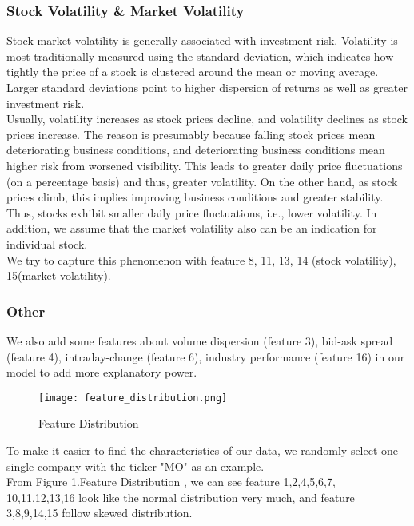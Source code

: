 \documentclass[fleqn,10pt]{SelfArx} %
\begin{document}
\subsubsection*{Stock Volatility \& Market Volatility}
Stock market volatility is generally associated with investment risk. Volatility is most traditionally measured using the standard deviation, which indicates how tightly the price of a stock is clustered around the mean or moving average. Larger standard deviations point to higher dispersion of returns as well as greater investment risk. \\
\newline
\noindent
 Usually, volatility increases as stock prices decline, and volatility declines as stock prices increase. The reason is presumably because falling stock prices mean deteriorating business conditions, and deteriorating business conditions mean higher risk from worsened visibility. This leads to greater daily price fluctuations (on a percentage basis) and thus, greater volatility. On the other hand, as stock prices climb, this implies improving business conditions and greater stability. Thus, stocks exhibit smaller daily price fluctuations, i.e., lower volatility. In addition, we assume that the market volatility also can be an indication for individual stock.\\
\newline
\noindent
We try to capture this phenomenon with feature 8, 11, 13, 14 (stock volatility), 15(market volatility).

\subsubsection*{Other}
We also add some features about volume dispersion (feature 3), bid-ask spread (feature 4), intraday-change (feature 6), industry performance (feature 16) in our model to add more explanatory power.\\

\begin{figure}[htb]\centering %
\texttt{[image: feature\_distribution.png]}
\caption{Feature Distribution}
\label{fig:view}
\end{figure}

\noindent
To make it easier to find the characteristics of our data, we randomly select one single company with the ticker "MO" as an example.\\
\newline
\noindent
From Figure 1.Feature Distribution , we can see feature 1,2,4,5,6,7,\\
10,11,12,13,16 look like the normal distribution very much, and feature 3,8,9,14,15 follow skewed distribution.\\
\end{document}
